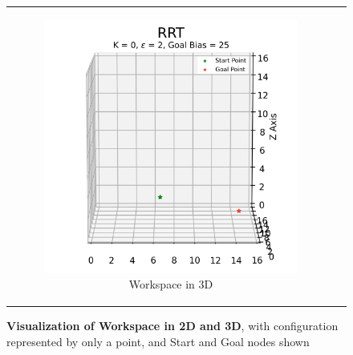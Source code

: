 \begin{figure}[H]
\begin{centering}
\begin{tabular}{cc}
    \begin{subfigure}{0.5\linewidth}
    \includegraphics[width=\linewidth]{chapters/chapter2/img/visualizing/workspace3d.png}
    \caption{Workspace in 3D}
    \end{subfigure} \\

\end{tabular}
\caption[Visualization of Workspace in 2D and 3D]{\textbf{Visualization of Workspace in 2D and 3D}, with configuration represented by only a point, and Start and Goal nodes shown}
\label{fig:rrt_workspace}
\end{centering}
\end{figure}